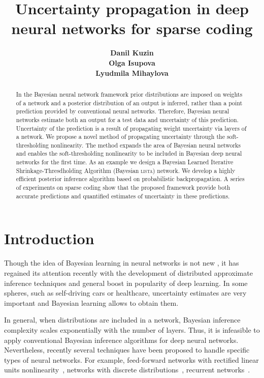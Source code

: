 \documentclass[letterpaper]{article}
\title{Uncertainty propagation in deep neural networks for sparse coding}
\author{} %
\author{ {\bf Danil Kuzin} \\
\And
{\bf Olga Isupova}  \\
\And
{\bf Lyudmila Mihaylova}   \\
}
\begin{document}
\maketitle

\begin{abstract}
In the Bayesian neural network framework prior distributions are imposed on weights of a network and a posterior distribution of an output is inferred, rather than a point prediction provided by conventional neural networks. Therefore, Bayesian neural networks estimate both an output for a test data and uncertainty of this prediction. Uncertainty of the prediction is a result of propagating weight uncertainty via layers of a network. We propose a novel method of propagating uncertainty through the soft-thresholding nonlinearity. The method expands the area of Bayesian neural networks and enables the soft-thresholding nonlinearity to be included in Bayesian deep neural networks for the first time. As an example we design a Bayesian Learned Iterative Shrinkage-Thresdholding Algorithm (Bayesian \textsc{lista}) network. We develop a highly efficient posterior inference algorithm based on probabilistic backpropagation. A series of experiments on sparse coding show that the proposed framework provide both accurate predictions and quantified estimates of uncertainty in these predictions.
\end{abstract}

\section{Introduction}
Though the idea of Bayesian learning in neural networks is not new \citep{neal2012bayesian}, it has regained its attention recently with the development of distributed approximate inference techniques \citep{li2015stochastic, hoffman2013stochastic}  and general boost in popularity of deep learning. In some spheres, such as self-driving cars or healthcare, uncertainty estimates are very important and Bayesian learning allows to obtain them. 

In general, when distributions are included in a network, Bayesian inference complexity scales exponentially with the number of layers. Thus, it is infeasible to apply conventional Bayesian inference algorithms for deep neural networks. Nevertheless, recently several techniques have been proposed to handle specific types of neural networks. For example, feed-forward networks with rectified linear units nonlinearity~\citep{hernandez2015probabilistic}, networks with discrete distributions~\citep{soudry2014expectation}, recurrent networks~\citep{mcdermott2017bayesian}. 
\end{document}
